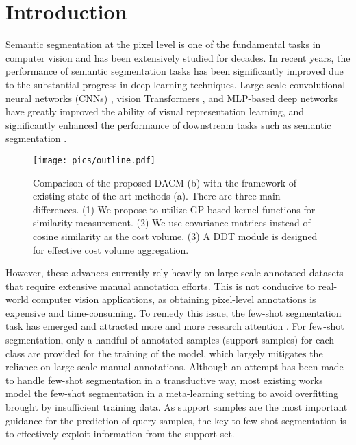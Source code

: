 \documentclass[runningheads]{llncs}
\begin{document}
\section{Introduction}
Semantic segmentation at the pixel level \cite{zheng2021rethinking,yang2020fda,long2015fully,hao2020brief} is one of the fundamental tasks in computer vision and has been extensively studied for decades. In recent years, the performance of semantic segmentation tasks has been significantly improved due to the substantial progress in deep learning techniques. Large-scale convolutional neural networks (CNNs) \cite{simonyan2014very,he2016deep}, vision Transformers \cite{dosovitskiy2020image,liu2021swin}, and MLP-based deep networks \cite{liu2021pay} have greatly improved the ability of visual representation learning, and significantly enhanced the performance of downstream tasks such as semantic segmentation \cite{zhu2021unified,zheng2021rethinking}. 

\begin{figure}[t]
	\centering
	\texttt{[image: pics/outline.pdf]}
	\caption{Comparison of the proposed DACM (b) with the framework of existing state-of-the-art methods (a). There are three main differences. (1) We propose to utilize GP-based kernel functions for similarity measurement. (2) We use covariance matrices instead of cosine similarity as the cost volume. (3) A DDT module is designed for effective cost volume aggregation.
}
	\label{compare}
\end{figure} 

However, these advances currently rely heavily on large-scale annotated datasets that require extensive manual annotation efforts. This is not conducive to real-world computer vision applications, as obtaining pixel-level annotations is expensive and time-consuming. To remedy this issue, the few-shot segmentation task has emerged and attracted more and more research attention \cite{yang2020prototype,wang2019panet,liu2020part,yang2020new,hu2019attention,zhang2019pyramid}. For few-shot segmentation, only a handful of annotated samples (support samples) for each class are provided for the training of the model, which largely mitigates the reliance on large-scale manual annotations. Although an attempt has been made \cite{boudiaf2021few} to handle few-shot segmentation in a transductive way, most existing works model the few-shot segmentation in a meta-learning setting \cite{shaban2017one,vinyals2016matching} to avoid overfitting 
brought by insufficient training data. As support samples are the most important guidance for the prediction of query samples, the key to few-shot segmentation is to effectively exploit information from the support set.
\end{document}
